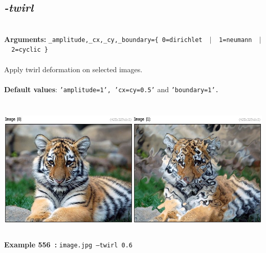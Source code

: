 \documentclass[a4paper,11pt,twoside]{book}
\begin{document}
\subsection{\emph{-twirl} }\vspace*{-0.5em}
~\\\textbf{Arguments: } 
{\small \texttt{\_amplitude,\_cx,\_cy,\_boundary=\{ 0=dirichlet ~$|$~ 1=neumann ~$|$~ 2=cyclic \}}}\\~\\
Apply twirl deformation on selected images.
~\\~\\\textbf{Default values}: {\small \texttt{'amplitude=1', 'cx=cy=0.5'} and \texttt{'boundary=1'.}}
\begin{center}\includegraphics[keepaspectratio=true,height=7cm,width=\textwidth]{img/gmic_def556.jpg}\\
{\footnotesize \textbf{Example 556~:} \texttt{image.jpg --twirl 0.6}}
\end{center}
\end{document}
